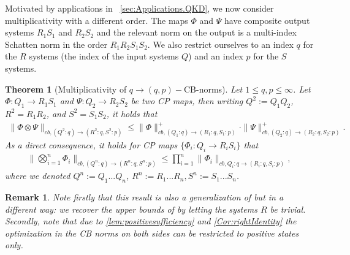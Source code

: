 \documentclass[11pt]{article}
\newcommand{\1}{\ensuremath{\mathbbm{1}}}
\theoremstyle{newdefinition}
\theoremstyle{newplain}
\newtheorem{theorem}[definition]{Theorem}
\newtheorem{remark}[definition]{Remark}
\theoremstyle{myplain}
\begin{document}
Motivated by applications in~ \cref{sec:Applications.QKD}, we now consider multiplicativity with a different order. The maps $\Phi$ and $\Psi$ have composite output systems $R_1S_1$ and $R_2S_2$ and the relevant norm on the output is a multi-index Schatten norm in the order $R_1R_2S_1S_2$. We also restrict ourselves to an index $q$ for the $R$ systems (the index of the input systems $Q$) and an index $p$ for the $S$ systems.


\begin{theorem}[Multiplicativity of $q \to (q,p)-$CB-norms] \label{thm:mainchainrule} 
Let $1 \leq q,p \leq \infty$. Let $\Phi:Q_1\to R_1S_1$ and $\Psi:Q_2\to R_2S_2$ be two CP maps, then writing $Q^2:=Q_1Q_2$, $R^2=R_1R_2$, and $S^2=S_1S_2$, it holds that
    \begin{align}
        \|\Phi\otimes\Psi\|_{cb,(Q^2:q)\to (R^2:q,S^2:p)} \leq \|\Phi\|^{+}_{cb,(Q_1:q)\to({R_1}:q,{S_1}:p)} \cdot \|\Psi\|^{+}_{cb,(Q_2:q)\to(R_2:q,{S_2}:p)}. 
    \end{align} 
       As a direct consequence, it holds for CP maps $\{\Phi_i:Q_i\to R_iS_i\}$ that
    \begin{align}
   \bigg\|\bigotimes^n_{i=1}\Phi_i\bigg\|_{cb,(Q^n:q)\to (R^n:q,S^n:p)}\leq \prod_{i=1}^n\|\Phi_i\|_{cb,{Q_i}:q\to ({R_i}:q, {S_i}:p)},
    \end{align}
    where we denoted $Q^n:=Q_1...Q_n$, $R^n:=R_1...R_n, S^n:=S_1...S_n$.
\end{theorem}   
\begin{remark}
Note firstly that this result is also a generalization of \cite[Theorem 11 and Theorem 13 c)]{Devetak.2006} but in a different way: we recover the upper bounds of \cite[Theorem 11 and Theorem 13 c)]{Devetak.2006} by letting the systems $R$ be trivial. Secondly, note that due to \cref{lem:positivesufficiency} and \cref{Cor:rightIdentity} the optimization in the CB norms on both sides can be restricted to positive states only.    
\end{remark}
\end{document}

